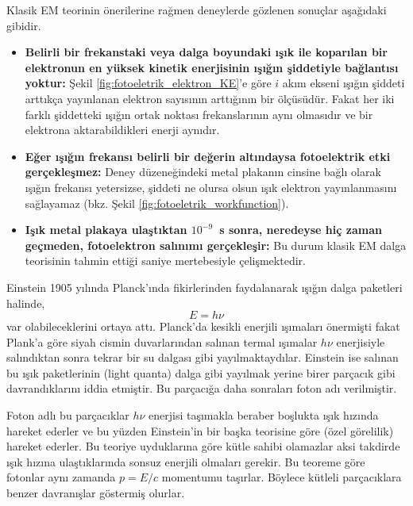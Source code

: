 \documentclass[a4paper,12pt, twoside]{article}
\begin{document}
Klasik EM teorinin önerilerine rağmen deneylerde gözlenen sonuçlar aşağıdaki gibidir.
\begin{itemize}
\item {\bf Belirli bir frekanstaki veya dalga boyundaki ışık ile koparılan bir elektronun en yüksek kinetik enerjisinin ışığın şiddetiyle bağlantısı yoktur:} Şekil \ref{fig:fotoeletrik_elektron_KE}'e göre $i$ akım ekseni ışığın şiddeti arttıkça yayınlanan elektron sayısının arttığının bir ölçüsüdür. Fakat her iki farklı şiddetteki ışığın ortak noktası frekanslarının aynı olmasıdır ve bir elektrona aktarabildikleri enerji aynıdır.

\item {\bf Eğer ışığın frekansı belirli bir değerin altındaysa fotoelektrik etki gerçekleşmez:} Deney düzeneğindeki metal plakanın cinsine bağlı olarak ışığın frekansı yetersizse, şiddeti ne olursa olsun ışık elektron yayınlanmasını sağlayamaz (bkz. Şekil \ref{fig:fotoeletrik_workfunction}).

\item {\bf Işık metal plakaya ulaştıktan $10^{-9}$~s sonra, neredeyse hiç zaman geçmeden, fotoelektron salınımı gerçekleşir:} Bu durum klasik EM dalga teorisinin tahmin ettiği saniye mertebesiyle çelişmektedir.

\end{itemize}

Einstein 1905 yılında Planck'ında fikirlerinden faydalanarak ışığın dalga paketleri halinde,
\begin{equation}
\label{eq:photon_E}
E = h\nu
\end{equation}
var olabileceklerini ortaya attı. Planck'da kesikli enerjili ışımaları önermişti fakat Plank'a göre siyah cismin duvarlarından salınan termal ışımalar $h\nu$  enerjisiyle salındıktan sonra tekrar bir su dalgası gibi yayılmaktaydılar. Einstein ise salınan bu ışık paketlerinin (light quanta) dalga gibi yayılmak yerine birer parçacık gibi davrandıklarını iddia etmiştir. Bu parçacığa daha sonraları foton adı verilmiştir.

Foton adlı bu parçacıklar $h \nu$ enerjisi taşımakla beraber boşlukta ışık hızında hareket ederler ve bu yüzden Einstein'in bir başka teorisine göre (özel görelilik) hareket ederler. Bu teoriye uyduklarına göre kütle sahibi olamazlar aksi takdirde ışık hızına ulaştıklarında sonsuz enerjili olmaları gerekir. Bu teoreme göre fotonlar aynı zamanda $p = E/c$ momentumu taşırlar. Böylece kütleli parçacıklara benzer davranışlar göstermiş olurlar.
\end{document}
